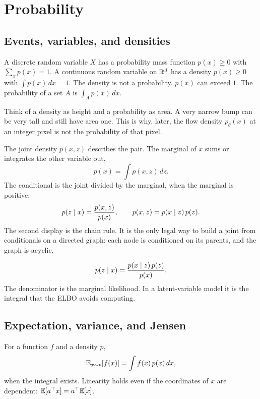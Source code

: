 \chapter{Probability}
\label{ch:prob}

\section{Events, variables, and densities}

\begin{defbox}
A discrete random variable $X$ has a probability mass function $p(x)\ge 0$ with $\sum_x p(x)=1$. A continuous random variable on $\mathbb{R}^d$ has a density $p(x)\ge 0$ with $\int p(x)\,dx=1$. The density is not a probability. $p(x)$ can exceed $1$. The probability of a set $A$ is $\int_A p(x)\,dx$.
\end{defbox}

\begin{intbox}
Think of a density as height and a probability as area. A very narrow bump can be very tall and still have area one. This is why, later, the flow density $p_\theta(x)$ at an integer pixel is not the probability of that pixel.
\end{intbox}

The joint density $p(x,z)$ describes the pair. The marginal of $x$ sums or integrates the other variable out,
\[
p(x)=\int p(x,z)\,dz.
\]
The conditional is the joint divided by the marginal, when the marginal is positive:
\[
p(z\mid x)=\frac{p(x,z)}{p(x)},\qquad p(x,z)=p(x\mid z)\,p(z).
\]
The second display is the chain rule. It is the only legal way to build a joint from conditionals on a directed graph: each node is conditioned on its parents, and the graph is acyclic.

\begin{resultbox}[Bayes]
\[
p(z\mid x)=\frac{p(x\mid z)\,p(z)}{p(x)}.
\]
The denominator is the marginal likelihood. In a latent-variable model it is the integral that the ELBO avoids computing.
\end{resultbox}

\section{Expectation, variance, and Jensen}

\begin{defbox}[Expectation]
For a function $f$ and a density $p$,
\[
\mathbb{E}_{x\sim p}[f(x)]=\int f(x)\,p(x)\,dx,
\]
when the integral exists. Linearity holds even if the coordinates of $x$ are dependent: $\mathbb{E}[a^\top x]=a^\top\mathbb{E}[x]$.
\end{defbox}

